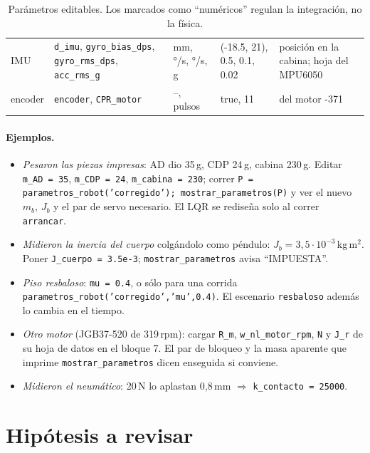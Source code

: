 \documentclass[11pt,a4paper]{article}
\newcommand{\code}[1]{\texttt{#1}}
\begin{document}
\begin{table}[H]
\begin{tabularx}{\textwidth}{>{\raggedright\arraybackslash}p{2.3cm} >{\raggedright\arraybackslash}p{4.3cm} >{\raggedright\arraybackslash}p{1.9cm} >{\raggedright\arraybackslash}p{2.0cm} X}
    IMU & \code{d\_imu}, \code{gyro\_bias\_dps}, \code{gyro\_rms\_dps}, \code{acc\_rms\_g} & mm, °/s, °/s, g & (-18.5, 21), 0.5, 0.1, 0.02 & posición en la cabina; hoja del MPU6050 \\
    encoder & \code{encoder}, \code{CPR\_motor} & --, pulsos & true, 11 & del motor -371 \\
    \bottomrule
  \end{tabularx}
  \caption{Parámetros editables. Los marcados como ``numéricos'' regulan la integración, no la física.}
\end{table}

\paragraph{Ejemplos.}
\begin{itemize}\itemsep2pt
  \item \emph{Pesaron las piezas impresas}: AD dio 35\,g, CDP 24\,g, cabina 230\,g. Editar \code{m\_AD = 35},
  \code{m\_CDP = 24}, \code{m\_cabina = 230}; correr \code{P = parametros\_robot('corregido'); mostrar\_parametros(P)}
  y ver el nuevo $m_b$, $J_b$ y el par de servo necesario. El LQR se rediseña solo al correr \code{arrancar}.
  \item \emph{Midieron la inercia del cuerpo} colgándolo como péndulo: $J_b = 3{,}5\cdot10^{-3}$\,kg\,m$^2$.
  Poner \code{J\_cuerpo = 3.5e-3}; \code{mostrar\_parametros} avisa ``IMPUESTA''.
  \item \emph{Piso resbaloso}: \code{mu = 0.4}, o sólo para una corrida
  \code{parametros\_robot('corregido','mu',0.4)}. El escenario \code{resbaloso} además lo cambia en el tiempo.
  \item \emph{Otro motor} (JGB37-520 de 319\,rpm): cargar \code{R\_m}, \code{w\_nl\_motor\_rpm}, \code{N} y
  \code{J\_r} de su hoja de datos en el bloque 7. El par de bloqueo y la masa aparente que imprime
  \code{mostrar\_parametros} dicen enseguida si conviene.
  \item \emph{Midieron el neumático}: 20\,N lo aplastan 0{,}8\,mm $\Rightarrow$ \code{k\_contacto = 25000}.
\end{itemize}

\section{Hipótesis a revisar}
\end{document}
